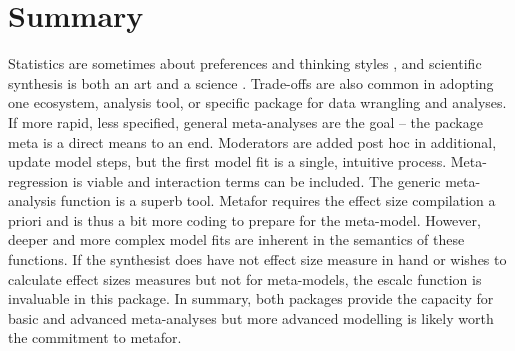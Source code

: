 \section{Summary}

Statistics are sometimes about preferences and thinking styles \cite{RN6087}, and scientific synthesis is both an art and a science \cite{RN3629}.  Trade-offs are also common in adopting one ecosystem, analysis tool, or specific package for data wrangling and analyses.  If more rapid, less specified, general meta-analyses are the goal – the package meta is a direct means to an end.  Moderators are added post hoc in additional, update model steps, but the first model fit is a single, intuitive process.  Meta-regression is viable and interaction terms can be included.  The generic meta-analysis function is a superb tool.  Metafor requires the effect size compilation a priori and is thus a bit more coding to prepare for the meta-model.  However, deeper and more complex model fits are inherent in the semantics of these functions.  If the synthesist does have not effect size measure in hand or wishes to calculate effect sizes measures but not for meta-models, the escalc function is invaluable in this package.  In summary, both packages provide the capacity for basic and advanced meta-analyses but more advanced modelling is likely worth the commitment to metafor.





\address{Christopher J. Lortie\\
  The National Center for Ecological Analysis and Synthesis, UCSB\\
  735 State St. Santa Barbara\\
  USA\\
  \href{http://orcid.org/0000-0002-4291-7023}{ORCID}\\
  }


